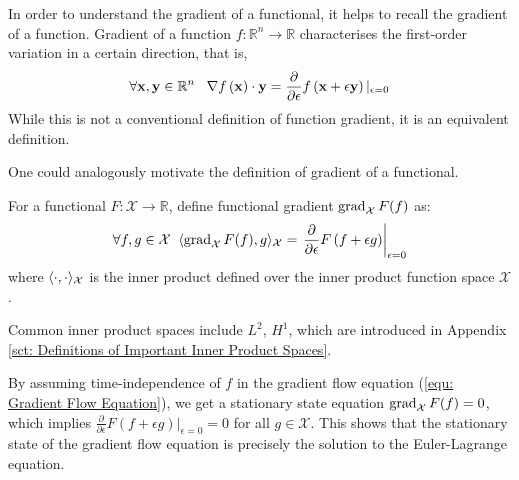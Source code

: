 \documentclass[../dissertation.tex]{subfiles}
\begin{document}
In order to understand the gradient of a functional, it helps to recall the gradient of a function.
Gradient of a function $f:\mathbb{R}^n \rightarrow \mathbb{R}$ characterises the first-order variation in a certain direction,
that is,
\begin{equation}
    \forall \mathbf{x}, \mathbf{y} \in \mathbb{R}^n \; \; \;
    \nabla f \left( \mathbf{x} \right) \cdot \mathbf{y} = \frac{\partial}{\partial \epsilon} f\left( \mathbf{x} + \epsilon \mathbf{y} \right)|_{\epsilon=0}
\end{equation}
While this is not a conventional definition of function gradient, it is an equivalent definition.

One could analogously motivate the definition of gradient of a functional.
\begin{definition}
    For a functional $F:\mathcal{X} \rightarrow \mathbb{R}$, define functional gradient $\operatorname{grad}_{\mathcal{X}} F (f)$ as:
    \begin{equation}
        \forall f, g \in \mathcal{X} \; \; \langle \operatorname{grad}_{\mathcal{X}} F (f), g \rangle_{\mathcal{X}} = \left.\frac{\partial}{\partial \epsilon} F \left( f + \epsilon g \right)\right|_{\epsilon = 0}
        \label{equ: Functional Gradient Definition}
    \end{equation}
    where $\langle \cdot, \cdot \rangle_{\mathcal{X}}$ is the inner product defined over the inner product function space $\mathcal{X}$.
\end{definition}

Common inner product spaces include $L^2$, $H^1$, which are introduced in Appendix \ref{sct: Definitions of Important Inner Product Spaces}.

\begin{remark}
    By assuming time-independence of $f$ in the gradient flow equation (\ref{equ: Gradient Flow Equation}), we get a stationary state equation $\operatorname{grad}_{\mathcal{X}} F(f) = 0$,
    which implies $\frac{\partial}{\partial \epsilon} F \left( f + \epsilon g \right)|_{\epsilon=0} = 0$ for all $g \in \mathcal{X}$.
    This shows that the stationary state of the gradient flow equation is precisely the solution to the Euler-Lagrange equation.
\end{remark}
\end{document}
